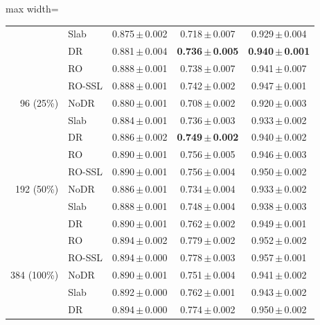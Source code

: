 \documentclass[preprint,12pt]{elsarticle}
\newcommand{\pmsd}[2]{#1\,$\pm$\,#2}
\begin{document}
\begin{table}[t]
\begin{adjustbox}{max width=\linewidth}
\begin{tabular}{@{}rlccc@{}}
 & Slab & \pmsd{0.875}{0.002} & \pmsd{0.718}{0.007} & \pmsd{0.929}{0.004} \\
 & DR & \pmsd{0.881}{0.004} & \textbf{\pmsd{0.736}{0.005}} & \textbf{\pmsd{0.940}{0.001}} \\
\midrule
\multirow{5}{*}{96 (25\%)} & RO & \pmsd{0.888}{0.001} & \pmsd{0.738}{0.007} & \pmsd{0.941}{0.007} \\
 & RO-SSL & \pmsd{0.888}{0.001} & \pmsd{0.742}{0.002} & \pmsd{0.947}{0.001} \\
 & NoDR & \pmsd{0.880}{0.001} & \pmsd{0.708}{0.002} & \pmsd{0.920}{0.003} \\
 & Slab & \pmsd{0.884}{0.001} & \pmsd{0.736}{0.003} & \pmsd{0.933}{0.002} \\
 & DR & \pmsd{0.886}{0.002} & \textbf{\pmsd{0.749}{0.002}} & \pmsd{0.940}{0.002} \\
\midrule
\multirow{5}{*}{192 (50\%)} & RO & \pmsd{0.890}{0.001} & \pmsd{0.756}{0.005} & \pmsd{0.946}{0.003} \\
 & RO-SSL & \pmsd{0.890}{0.001} & \pmsd{0.756}{0.004} & \pmsd{0.950}{0.002} \\
 & NoDR & \pmsd{0.886}{0.001} & \pmsd{0.734}{0.004} & \pmsd{0.933}{0.002} \\
 & Slab & \pmsd{0.888}{0.001} & \pmsd{0.748}{0.004} & \pmsd{0.938}{0.003} \\
 & DR & \pmsd{0.890}{0.001} & \pmsd{0.762}{0.002} & \pmsd{0.949}{0.001} \\
\midrule
\multirow{5}{*}{384 (100\%)} & RO & \pmsd{0.894}{0.002} & \pmsd{0.779}{0.002} & \pmsd{0.952}{0.002} \\
 & RO-SSL & \pmsd{0.894}{0.000} & \pmsd{0.778}{0.003} & \pmsd{0.957}{0.001} \\
 & NoDR & \pmsd{0.890}{0.001} & \pmsd{0.751}{0.004} & \pmsd{0.941}{0.002} \\
 & Slab & \pmsd{0.892}{0.000} & \pmsd{0.762}{0.001} & \pmsd{0.943}{0.002} \\
 & DR & \pmsd{0.894}{0.000} & \pmsd{0.774}{0.002} & \pmsd{0.950}{0.002} \\
\bottomrule
\end{tabular}
\end{adjustbox}
\end{table}
\end{document}

